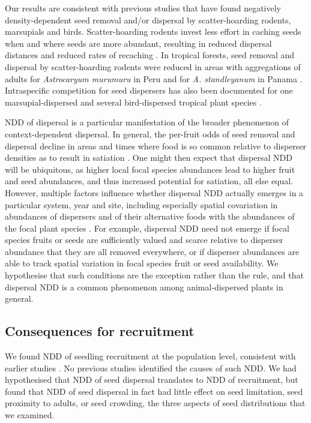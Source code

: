 \documentclass[b5paper,justified]{tufte-book} %
\begin{document}
\begin{fullwidth}
Our results are consistent with previous studies that have found negatively density-dependent seed removal and/or dispersal by scatter-hoarding rodents, marsupials and birds. Scatter-hoarding rodents invest less effort in caching seeds when and where seeds are more abundant, resulting in reduced dispersal distances and reduced rates of recaching
\citep[e.g.][]{VanderWall2002, Jansen2012}. In tropical forests, seed removal and dispersal by scatter-hoarding rodents were reduced in areas with aggregations of adults for \textit{Astrocaryum murumuru} in Peru \citep{Beck2002} and for \textit{A. standleyanum} in Panama \citep{Galvez2009}. Intraspecific competition for seed dispersers has also been documented for one marsupial-dispersed and several bird-dispersed tropical plant species \citep{Howe1977, Howe1981, Manasse1983, Sargent1990, Poulin1999, Saracco2005, Morales2012}.

NDD of dispersal is a particular manifestation of the broader phenomenon of context-dependent dispersal. In general, the per-fruit odds of seed removal and dispersal decline in areas and times where food is so common relative
to disperser densities as to result in satiation \citep[e.g.][]{VanderWall2002, Jansen2004, Klinger2009}. One might then expect that dispersal NDD will be ubiquitous, as higher local focal species abundances lead to higher fruit and seed abundances, and thus increased potential for satiation, all else equal. However, multiple factors influence whether dispersal NDD actually emerges in a particular system, year and site, including especially spatial covariation in abundances of dispersers and of their alternative foods with the abundances of the focal plant species \citep{Klinger2009}. For example, dispersal NDD need not emerge if focal species fruits or seeds are sufficiently valued and scarce relative to disperser abundance that they are all removed everywhere, or if disperser abundances are able to track spatial variation in focal species fruit or seed availability. We hypothesise that such conditions are the exception rather than the rule, and that dispersal NDD is a common phenomenon among animal-dispersed plants in general.

\subsection{Consequences for recruitment}

We found NDD of seedling recruitment at the population level, consistent with earlier studies \citep[reviewed in][]{Wright2002}. No previous studies identified the causes of such NDD. We had hypothesised that NDD of seed dispersal translates to NDD of recruitment, but found that NDD of seed dispersal in fact had little effect on seed limitation, seed proximity to adults, or seed crowding, the three aspects of seed distributions that we examined. 


\end{fullwidth}
\end{document}
